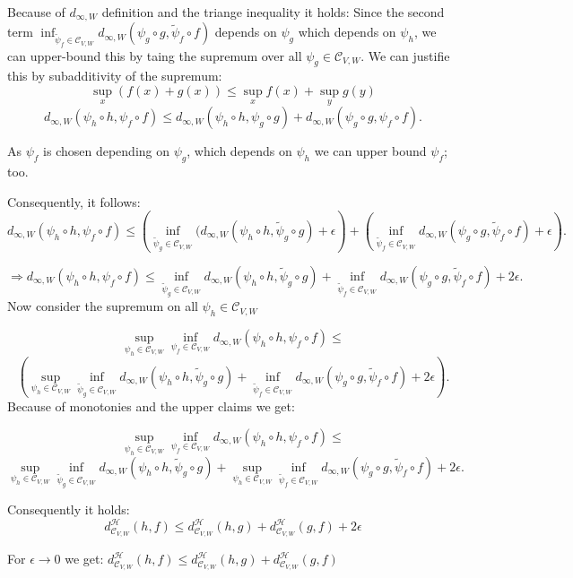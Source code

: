 Because of $d_{\infty, W}$ definition and the triange inequality it holds: 
Since the second term $\inf_{\tilde{\psi}_f\in \mathcal{C}_{V,W}}d_{\infty,W}(\psi_g\circ g, \tilde{\psi}_f\circ f)$ depends on $\psi_g$ which depends on $\psi_h$, we can upper-bound this by taing the supremum over all $\psi_g\in \mathcal{C}_{V,W}$.
We can justifie this by subadditivity of the supremum:
\[\sup_x(f(x) +g(x))\leq \sup_x f(x) + \sup_y g(y)\]
\[d_{\infty, W}(\psi_h\circ h, \psi_f \circ f)\leq d_{\infty, W}(\psi_h\circ h, \psi_g \circ g) +d_{\infty, W}(\psi_g\circ g, \psi_f \circ f).\]

As $\psi_f$ is chosen depending on $\psi_g$, which depends on $\psi_h$ we can upper bound $\psi_f$; too.

Consequently, it follows:
\[d_{\infty, W}(\psi_h\circ h, \psi_f \circ f)\leq \left(\inf_{\tilde{\psi}_g\in \mathcal{C}_{V,W}}(d_{\infty, W}(\psi_h\circ h, \tilde{\psi}_g \circ g) + \epsilon\right)+\left(\inf_{\tilde{\psi}_f\in \mathcal{C}_{V,W}}d_{\infty, W}(\psi_g\circ g, \tilde{\psi}_f \circ f)+\epsilon\right).\]

\[\Longrightarrow d_{\infty, W}(\psi_h\circ h, \psi_f \circ f)\leq \inf_{\tilde{\psi}_g\in \mathcal{C}_{V,W}}d_{\infty, W}(\psi_h\circ h, \tilde{\psi}_g \circ g)+\inf_{\tilde{\psi}_f\in \mathcal{C}_{V,W}}d_{\infty, W}(\psi_g\circ g, \tilde{\psi}_f \circ f)+2\epsilon.\]
Now consider the supremum on all $\psi_h\in \mathcal{C}_{V,W}$

\[\sup_{\psi_h\in\mathcal{C}_{V,W}} \inf_{\psi_f\in\mathcal{C}_{V,W}} d_{\infty, W}(\psi_h\circ h, \psi_f \circ f)\leq \]\[\left(\sup_{\psi_h\in\mathcal{C}_{V,W}}\inf_{\tilde{\psi}_g\in \mathcal{C}_{V,W}}d_{\infty, W}(\psi_h\circ h, \tilde{\psi}_g \circ g)+\inf_{\tilde{\psi}_f\in \mathcal{C}_{V,W}}d_{\infty, W}(\psi_g\circ g, \tilde{\psi}_f \circ f)+2\epsilon\right).\]
Because of monotonies and the upper claims we get: 

\[\sup_{\psi_h\in\mathcal{C}_{V,W}} \inf_{\psi_f\in\mathcal{C}_{V,W}} d_{\infty, W}(\psi_h\circ h, \psi_f \circ f)\leq \]\[\sup_{\psi_h\in\mathcal{C}_{V,W}}\inf_{\tilde{\psi}_g\in \mathcal{C}_{V,W}}d_{\infty, W}(\psi_h\circ h, \tilde{\psi}_g \circ g)+\sup_{\psi_h\in\mathcal{C}_{V,W}}\inf_{\tilde{\psi}_f\in \mathcal{C}_{V,W}}d_{\infty, W}(\psi_g\circ g, \tilde{\psi}_f \circ f)+2\epsilon.\]

Consequently it holds:
\[d^\mathcal{H}_{\mathcal{C}_{V,W}}(h,f) \leq d^\mathcal{H}_{\mathcal{C}_{V,W}}(h,g) + d^\mathcal{H}_{\mathcal{C}_{V,W}}(g,f)+2\epsilon\]

For $\epsilon \to 0$ we get:
$d^\mathcal{H}_{\mathcal{C}_{V,W}}(h,f) \leq d^\mathcal{H}_{\mathcal{C}_{V,W}}(h,g) + d^\mathcal{H}_{\mathcal{C}_{V,W}}(g,f)$


